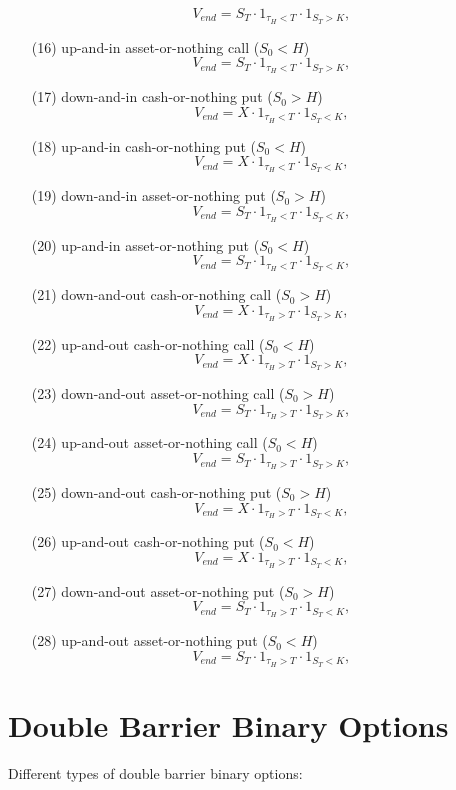\begin{enumerate}
	\[
		V_{end} = S_T \cdot 1_{\tau_H < T} \cdot 1_{S_T>K},
	\]
\item[(16)] up-and-in asset-or-nothing call ($S_0<H$)
	\[
		V_{end} = S_T \cdot 1_{\tau_H < T} \cdot 1_{S_T>K},
	\]
\item[(17)] down-and-in cash-or-nothing put ($S_0>H$)
	\[
		V_{end} = X \cdot 1_{\tau_H < T} \cdot 1_{S_T<K},
	\]
\item[(18)] up-and-in cash-or-nothing put ($S_0<H$)
	\[
		V_{end} = X \cdot 1_{\tau_H < T} \cdot 1_{S_T<K},
	\]
\item[(19)] down-and-in asset-or-nothing put ($S_0>H$)
	\[
		V_{end} = S_T \cdot 1_{\tau_H < T} \cdot 1_{S_T<K},
	\]
\item[(20)] up-and-in asset-or-nothing put ($S_0<H$)
	\[
		V_{end} = S_T \cdot 1_{\tau_H < T} \cdot 1_{S_T<K},
	\]
\item[(21)] down-and-out cash-or-nothing call ($S_0>H$)
	\[
		V_{end} = X \cdot 1_{\tau_H > T} \cdot 1_{S_T>K},
	\]
\item[(22)] up-and-out cash-or-nothing call ($S_0<H$)
	\[
		V_{end} = X \cdot 1_{\tau_H > T} \cdot 1_{S_T>K},
	\]
\item[(23)] down-and-out asset-or-nothing call ($S_0>H$)
	\[
		V_{end} = S_T \cdot 1_{\tau_H > T} \cdot 1_{S_T>K},
	\]
\item[(24)] up-and-out asset-or-nothing call ($S_0<H$)
	\[
		V_{end} = S_T \cdot 1_{\tau_H > T} \cdot 1_{S_T>K},
	\]
\item[(25)] down-and-out cash-or-nothing put ($S_0>H$)
	\[
		V_{end} = X \cdot 1_{\tau_H > T} \cdot 1_{S_T<K},
	\]
\item[(26)] up-and-out cash-or-nothing put ($S_0<H$)
	\[
		V_{end} = X \cdot 1_{\tau_H > T} \cdot 1_{S_T<K},
	\]
\item[(27)] down-and-out asset-or-nothing put ($S_0>H$)
	\[
		V_{end} = S_T \cdot 1_{\tau_H > T} \cdot 1_{S_T<K},
	\]
\item[(28)] up-and-out asset-or-nothing put ($S_0<H$)
	\[
		V_{end} = S_T \cdot 1_{\tau_H > T} \cdot 1_{S_T<K},
	\]
\end{enumerate}


\section{Double Barrier Binary Options}

Different types of double barrier binary options:

